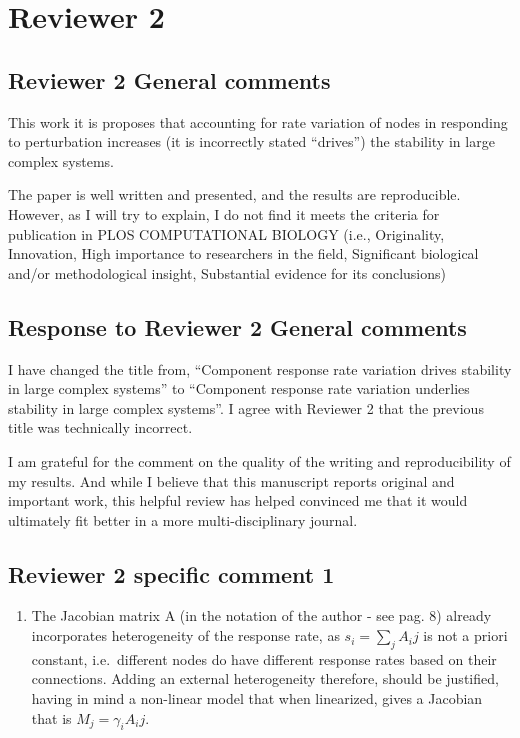 \documentclass[]{article}
\providecommand{\tightlist}{%
  \setlength{\itemsep}{0pt}\setlength{\parskip}{0pt}}
\begin{document}
\section{Reviewer 2}\label{reviewer-2}

\subsection{Reviewer 2 General
comments}\label{reviewer-2-general-comments}

This work it is proposes that accounting for rate variation of nodes in
responding to perturbation increases (it is incorrectly stated
``drives'') the stability in large complex systems.

The paper is well written and presented, and the results are
reproducible. However, as I will try to explain, I do not find it meets
the criteria for publication in PLOS COMPUTATIONAL BIOLOGY (i.e.,
Originality, Innovation, High importance to researchers in the field,
Significant biological and/or methodological insight, Substantial
evidence for its conclusions)

\subsection{Response to Reviewer 2 General
comments}\label{response-to-reviewer-2-general-comments}

I have changed the title from, ``Component response rate variation
drives stability in large complex systems'' to ``Component response rate
variation underlies stability in large complex systems''. I agree with
Reviewer 2 that the previous title was technically incorrect.

I am grateful for the comment on the quality of the writing and
reproducibility of my results. And while I believe that this manuscript
reports original and important work, this helpful review has helped
convinced me that it would ultimately fit better in a more
multi-disciplinary journal.

\subsection{Reviewer 2 specific comment
1}\label{reviewer-2-specific-comment-1}

\begin{enumerate}
\def\labelenumi{\arabic{enumi})}
\tightlist
\item
  The Jacobian matrix A (in the notation of the author - see pag. 8)
  already incorporates heterogeneity of the response rate, as
  \(s_i=\sum_j A_ij\) is not a priori constant, i.e.~different nodes do
  have different response rates based on their connections. Adding an
  external heterogeneity therefore, should be justified, having in mind
  a non-linear model that when linearized, gives a Jacobian that is
  \(M_j=\gamma_i A_ij\).
\end{enumerate}
\end{document}
